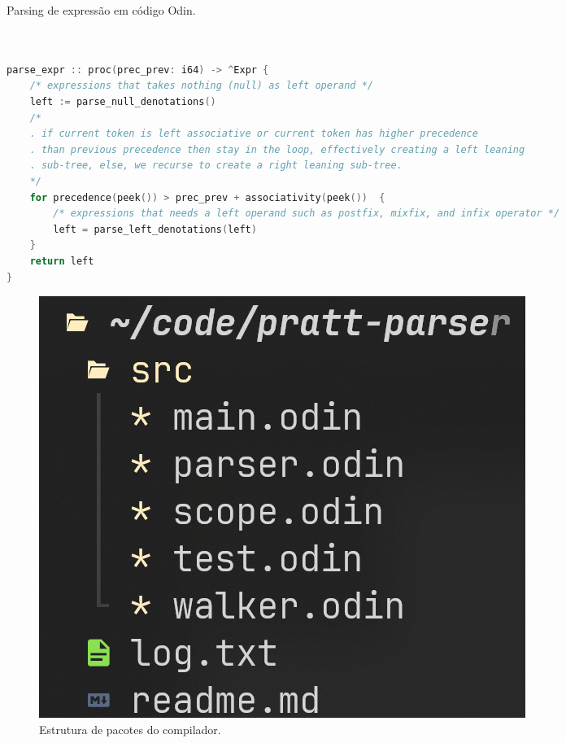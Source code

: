 \documentclass[english, 
               brazil, 
               bsc] %
               {dcomp-abntex2}
\begin{document}
\begin{algoritmo}[H]
  \caption{\small Parsing de expressão em código Odin.}
        \label{alg-pratt-parsing}
  \begin{lstlisting}[language=C]


parse_expr :: proc(prec_prev: i64) -> ^Expr {
    /* expressions that takes nothing (null) as left operand */
    left := parse_null_denotations() 
    /*
    . if current token is left associative or current token has higher precedence
    . than previous precedence then stay in the loop, effectively creating a left leaning
    . sub-tree, else, we recurse to create a right leaning sub-tree.
    */
    for precedence(peek()) > prec_prev + associativity(peek())  {
        /* expressions that needs a left operand such as postfix, mixfix, and infix operator */
        left = parse_left_denotations(left)
    }
    return left
}


  \end{lstlisting}
\end{algoritmo}


\begin{figure}[H]
        \caption{\label{folder} \small Estrutura de pacotes do compilador.}
        \begin{center}
            \includegraphics[scale=0.5]{./Imagens/folder_structuer_odin_parser_lexer.png}
        \end{center}
\end{figure}
\end{document}
